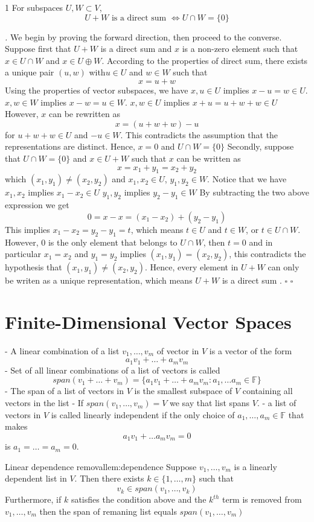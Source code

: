 \documentclass[11pt]{article}
\renewenvironment{proof}[1][\proofname]{\par\noindent\textit{#1.} }{\hfill$\square$\par}
\begin{document}
\begin{theorem}{}{1}
For subspaces $U, W \subset V$,
\[
  U + W \text{ is a direct sum } \Leftrightarrow U \cap W = \{0\}
\]
\end{theorem}
\begin{proof}
We begin by proving the forward direction, then proceed to the converse.
 Suppose first that $U + W$ is a direct sum and $x$ is a non-zero element such that $x \in U \cap W$ and $x \in U \oplus W$. 
 According to the properties of direct sum, there exists a unique pair $(u,w)$ with$u \in U$ and $w \in W$ such that
 $$
 x = u + w$$
Using the properties of vector subspaces, we have
 $x, u \in U$ implies $x - u = w \in U$.
 $x,w \in W$ implies $x - w = u \in W$. 
 $x, w\in U$ implies $x +u = u + w + w \in U$ 
 However, $x$ can be rewritten as
 $$x = (u + w +w) - u$$
 for $u + w + w \in U$ and $-u \in W$. This contradicts the assumption that the representations are distinct. Hence,  $x = 0$ and $U \cap W = \{0\}$
 Secondly, suppose that $U \cap W = \{0\}$ and $x \in U + W$ such that $x$ can be written as
 $$x = x_1+ y_1 = x_2 + y_2$$
 which $(x_1,y_1) \neq (x_2,y_2)$ and $x_1, x_2 \in U$, $y_1, y_2 \in W$.  Notice that we have
 $x_1, x_2$ implies $x_1 - x_2 \in U$ 
 $y_1, y_2$ implies $y_2 - y_1 \in W$ 
 By subtracting the two above expression we get
 $$
 0 = x - x = (x_1 - x_2) + (y_2 - y_1)
 $$
 This implies $x_1 - x_2 = y_2 - y_1 = t$, which means $t \in U$ and $t \in W$, or $t \in U \cap W$.
However, $0$ is the only element that belongs to $U \cap W$, then $t = 0$ and in particular $x_1 = x_2$ and $y_1 = y_2$ implies $(x_1,y_1) = (x_2,y_2)$, this contradicts the hypothesis that $(x_1,y_1) \neq (x_2,y_2)$. Hence, every element in $U + W$ can only be writen as a unique representation, which means $U+W$ is a direct sum . $\square$ 
\end{proof}

\section{Finite-Dimensional Vector Spaces}
- A linear combination of a list $v_1, \dots,v_m$ of vector in $V$ is a vector of the form
$$
a_1v_1 + \dots + a_mv_m
$$
- Set of all linear combinations of a list of vectors is called
	$$
		span(v_1 + \dots +v_m) = \{a_1v_1 + \dots + a_mv_m: a_1,\dots a_m \in \mathbb{F}\}
	$$
- The span of a list of vectors in $V$ is the smallest subspace of $V$ containing all vectors in the list
- If $span(v_1, \dots, v_m) = V$ we say that list spans $V$. 
- a list of vectors in $V$ is called linearly independent if the only choice of $a_1,\dots,a_m \in \mathbb{F}$ that makes
$$
a_1v_1 + \dots a_m v_m = 0
$$
    is $a_1 = \dots = a_m = 0$. 
\begin{lemma}{Linear dependence removal}{lem:dependence}
Suppose $v_1,\dots,v_m$ is a linearly dependent list in $V$. Then there exists $k \in \{1,\dots,m\}$ such that
 $$
 v_k \in span(v_1,\dots,v_k)$$
 Furthermore, if $k$ satisfies the condition above and the $k^{th}$ term is removed from $v_1,\dots,v_m$ then the span of remaning list equals $span(v_1,\dots,v_m)$  
\end{lemma}
\end{document}
